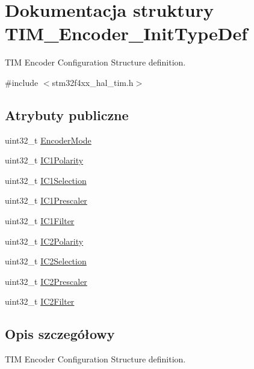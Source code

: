 \hypertarget{struct_t_i_m___encoder___init_type_def}{}\section{Dokumentacja struktury T\+I\+M\+\_\+\+Encoder\+\_\+\+Init\+Type\+Def}
\label{struct_t_i_m___encoder___init_type_def}


T\+IM Encoder Configuration Structure definition.  




{\ttfamily \#include $<$stm32f4xx\+\_\+hal\+\_\+tim.\+h$>$}

\subsection*{Atrybuty publiczne}
\begin{DoxyCompactItemize}
\item 
uint32\+\_\+t \hyperlink{struct_t_i_m___encoder___init_type_def_ab1e4b0752d88c04081e3ff2fea6aa52e}{Encoder\+Mode}
\item 
uint32\+\_\+t \hyperlink{struct_t_i_m___encoder___init_type_def_a3e27323d593e4f3b95ebaa3772e79618}{I\+C1\+Polarity}
\item 
uint32\+\_\+t \hyperlink{struct_t_i_m___encoder___init_type_def_a85fbdebacff594ff1ad0d16eddfdc179}{I\+C1\+Selection}
\item 
uint32\+\_\+t \hyperlink{struct_t_i_m___encoder___init_type_def_a56307eb4766e3f0e1cd1cd3c4fc2157e}{I\+C1\+Prescaler}
\item 
uint32\+\_\+t \hyperlink{struct_t_i_m___encoder___init_type_def_a50f3051c1b568b9dcde146199f97f3fb}{I\+C1\+Filter}
\item 
uint32\+\_\+t \hyperlink{struct_t_i_m___encoder___init_type_def_abb7968a8ba34e13da1fb8f5916a754ce}{I\+C2\+Polarity}
\item 
uint32\+\_\+t \hyperlink{struct_t_i_m___encoder___init_type_def_a84a39a8667f296b4b3fbe1a0add58396}{I\+C2\+Selection}
\item 
uint32\+\_\+t \hyperlink{struct_t_i_m___encoder___init_type_def_ac80972d0e157508ff075815da58070cb}{I\+C2\+Prescaler}
\item 
uint32\+\_\+t \hyperlink{struct_t_i_m___encoder___init_type_def_a30cdb580735007aa9735b2f5cc133049}{I\+C2\+Filter}
\end{DoxyCompactItemize}


\subsection{Opis szczegółowy}
T\+IM Encoder Configuration Structure definition. 

